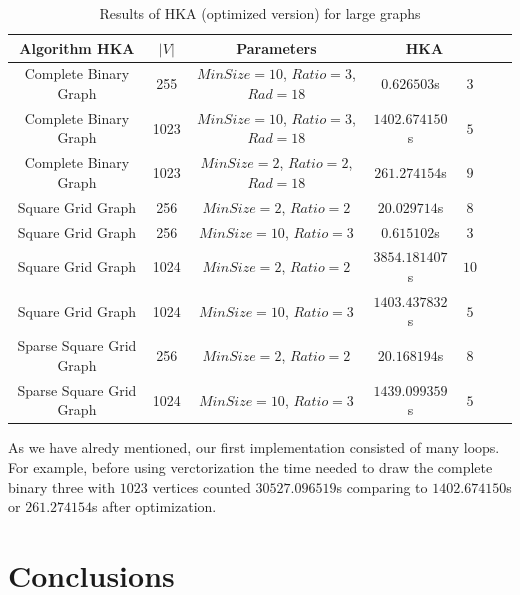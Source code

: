 \documentclass[12pt,a4paper]{article}
\begin{document}
\begin{table}[htb]
\small
\begin{tabular}{|c|c||c|c|c|c|c|}
\hline
Algorithm HKA & $|V|$ & Parameters & \multicolumn{2}{|c|}{HKA} \\
\hline
\hline 
Complete Binary Graph & 255 & $MinSize=10$, $Ratio=3$, $Rad = 18$ & $0.626503$s    & $3$ \\ 
\hline 
Complete Binary Graph & 1023 & $MinSize=10$, $Ratio=3$,$Rad = 18$ & $1402.674150$s & $5$ \\ 
\hline 
Complete Binary Graph & 1023 & $MinSize=2$, $Ratio=2$, $Rad = 18$ & $261.274154$s & $9$ \\ 
\hline \hline
Square Grid Graph     & 256 & $MinSize=2$, $Ratio=2$ & $20.029714$s & $8$ \\ 
\hline
Square Grid Graph     & 256 & $MinSize=10$, $Ratio=3$& $0.615102$s & $3$ \\ 
\hline
Square Grid Graph     & 1024 & $MinSize=2$, $Ratio=2$ & $3854.181407$s & $10$ \\ 
\hline
Square Grid Graph     & 1024 & $MinSize=10$, $Ratio=3$ & $1403.437832$s & $5$ \\ 
\hline\hline
Sparse Square Grid Graph & 256 & $MinSize=2$, $Ratio=2$ & $20.168194$s & $8$ \\ 
\hline
Sparse Square Grid Graph & 1024 & $MinSize=10$, $Ratio=3$ & $1439.099359$s & $5$ \\ 
\hline 

\end{tabular} 
\caption{Results of HKA (optimized version) for large graphs}
\label{table: large}
\end{table}

\FloatBarrier 

As we have alredy mentioned, our first implementation consisted of many loops. For example, before using verctorization the time needed to draw the complete binary three with $1023$ vertices counted $30527.096519$s comparing to $1402.674150$s or $261.274154$s after optimization.

\section{Conclusions}
\end{document}
